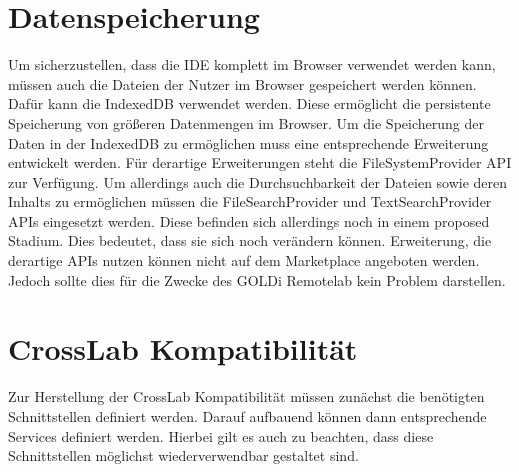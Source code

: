 \section{Datenspeicherung}

Um sicherzustellen, dass die IDE komplett im Browser verwendet werden kann, müssen auch die Dateien der Nutzer im Browser gespeichert werden können. Dafür kann die IndexedDB verwendet werden. Diese ermöglicht die persistente Speicherung von größeren Datenmengen im Browser. Um die Speicherung der Daten in der IndexedDB zu ermöglichen muss eine entsprechende Erweiterung entwickelt werden. Für derartige Erweiterungen steht die FileSystemProvider API zur Verfügung. Um allerdings auch die Durchsuchbarkeit der Dateien sowie deren Inhalts zu ermöglichen müssen die FileSearchProvider und TextSearchProvider APIs eingesetzt werden. Diese befinden sich allerdings noch in einem proposed Stadium. Dies bedeutet, dass sie sich noch verändern können. Erweiterung, die derartige APIs nutzen können nicht auf dem Marketplace angeboten werden. Jedoch sollte dies für die Zwecke des GOLDi Remotelab kein Problem darstellen.

\section{CrossLab Kompatibilität}

Zur Herstellung der CrossLab Kompatibilität müssen zunächst die benötigten Schnittstellen definiert werden. Darauf aufbauend können dann entsprechende Services definiert werden. Hierbei gilt es auch zu beachten, dass diese Schnittstellen möglichst wiederverwendbar gestaltet sind.